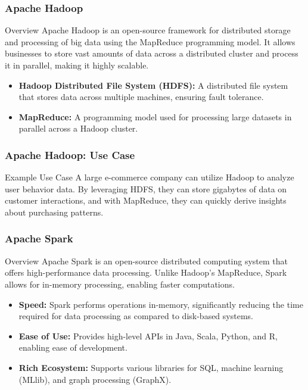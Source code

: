 \documentclass[aspectratio=169]{beamer}
\begin{document}
\begin{frame}[fragile]
    \frametitle{Apache Hadoop}
    \begin{block}{Overview}
        Apache Hadoop is an open-source framework for distributed storage and processing of big data using the MapReduce programming model. It allows businesses to store vast amounts of data across a distributed cluster and process it in parallel, making it highly scalable.
    \end{block}

    \begin{itemize}
        \item \textbf{Hadoop Distributed File System (HDFS):} A distributed file system that stores data across multiple machines, ensuring fault tolerance.
        \item \textbf{MapReduce:} A programming model used for processing large datasets in parallel across a Hadoop cluster.
    \end{itemize}
\end{frame}

\begin{frame}[fragile]
    \frametitle{Apache Hadoop: Use Case}
    \begin{block}{Example Use Case}
        A large e-commerce company can utilize Hadoop to analyze user behavior data. By leveraging HDFS, they can store gigabytes of data on customer interactions, and with MapReduce, they can quickly derive insights about purchasing patterns.
    \end{block}
\end{frame}

\begin{frame}[fragile]
    \frametitle{Apache Spark}
    \begin{block}{Overview}
        Apache Spark is an open-source distributed computing system that offers high-performance data processing. Unlike Hadoop's MapReduce, Spark allows for in-memory processing, enabling faster computations.
    \end{block}

    \begin{itemize}
        \item \textbf{Speed:} Spark performs operations in-memory, significantly reducing the time required for data processing as compared to disk-based systems.
        \item \textbf{Ease of Use:} Provides high-level APIs in Java, Scala, Python, and R, enabling ease of development.
        \item \textbf{Rich Ecosystem:} Supports various libraries for SQL, machine learning (MLlib), and graph processing (GraphX).
    \end{itemize}
\end{frame}
\end{document}
